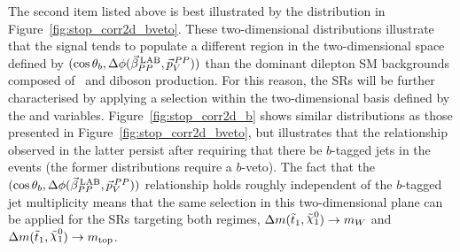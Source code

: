 The second item listed above is best illustrated by the distribution in Figure~\ref{fig:stop_corr2d_bveto}.
These two-dimensional distributions illustrate that the \bWN signal tends to populate
a different region in the two-dimensional space defined by $(\cos\theta_b, \Delta \phi (\vec{\beta}_{PP}^{\,\text{LAB}}, \vec{p}_V^{\,PP}))$ than
the dominant dilepton SM backgrounds composed of \ttbar~and diboson production.
For this reason, the SRs will be further characterised by applying a selection within
the two-dimensional basis defined by the \cosb and \dpb variables.
Figure~\ref{fig:stop_corr2d_b} shows similar distributions as those presented in Figure~\ref{fig:stop_corr2d_bveto},
but illustrates that the relationship observed in the latter persist after
requiring that there be $b$-tagged jets in the events (the former distributions require a $b$-veto).
The fact that the $(\cos\theta_b, \Delta \phi (\vec{\beta}_{PP}^{\,\text{LAB}}, \vec{p}_V^{\,PP}))$ relationship holds roughly independent of the $b$-tagged
jet multiplicity means that the same selection in this two-dimensional plane
can be applied for the SRs targeting both \bWN regimes, $\sdiff \rightarrow m_W$ and
$\sdiff \rightarrow m_{\text{top}}$.


